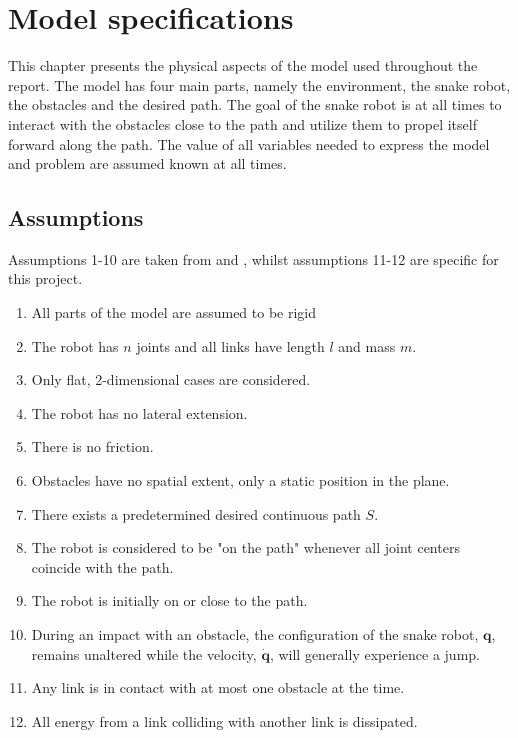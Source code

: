 \chapter{Model specifications} \label{ch:model_specs}

This chapter presents the physical aspects of the model used throughout the report. The model has four main parts, namely the environment, the snake robot, the obstacles and the desired path. The goal of the snake robot is at all times to interact with the obstacles close to the path and utilize them to propel itself forward along the path. The value of all variables needed to express the model and problem are assumed known at all times.

\section{Assumptions}\label{seq:assumptions}

Assumptions 1-10 are taken from \cite{StavdahlNote} and \cite{liljeback2010hybrid}, whilst assumptions 11-12 are specific for this project.

\begin{enumerate}
    \item All parts of the model are assumed to be rigid
    \item The robot has $n$ joints and all links have length $l$ and mass $m$.
    \item Only flat, 2-dimensional cases are considered.
    \item The robot has no lateral extension.
    \item There is no friction. 
    \item Obstacles have no spatial extent, only a static position in the plane.
    \item There exists a predetermined desired continuous path $S$.
    \item The robot is considered to be "on the path" whenever all joint centers coincide with the path.
    \item The robot is initially on or close to the path.
    \item During an impact with an obstacle, the configuration of the snake robot, $\mathbf{q}$, remains unaltered while the velocity, $\mathbf{\dot{q}}$, will generally experience a jump.
    \item Any link is in contact with at most one obstacle at the time.
    \item All energy from a link colliding with another link is dissipated.
\end{enumerate}

